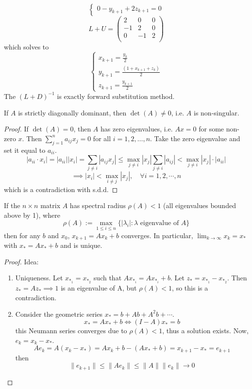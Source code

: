 \documentclass[11pt]{article}
\begin{document}
\begin{example}
\[\begin{cases}
            0-y_{k+1}+2z_{k+1} = 0 
        \end{cases}
    \]
    \[
    L+U =
        \begin{pmatrix}
            2 & 0 & 0\\
            -1 & 2 & 0 \\
            0 & -1 & 2 \\
        \end{pmatrix}
    \]
    which solves to
    \[
        \begin{cases}
            x_{k+1} = \frac{y_k}{2}\\
            y_{k+1} = \frac{(1+x_{k+1}+z_k)}{2}\\
            z_{k+1} = \frac{y_{k+1}}{2}
        \end{cases}
    \]
    The $(L+D)^{-1}$ is exactly forward substitution method.
\end{example}
\newpage
\begin{lemma}
    If $A$ is strictly diagonally dominant, then $\det(A) \ne 0$, i.e. $A$ is non-singular.   
\end{lemma}

\begin{proof}
    If $\det(A)=0$, then $A$ has zero eigenvalues, i.e. $Ax=0$ for some non-zero $x$.
    Then $\sum_{j=1}^{n}a_{ij}x_j = 0$ for all $i = 1,2,\dots,n$. Take the zero eigenvalue and set it equal to $a_{ii}$.
    \[
        |a_{ii} \cdot x_i| = |a_{ii}||x_i|=\sum_{j\ne i }|a_{ij}x_j| \le \max_{j\ne i}|x_j|\sum_{j\ne i }|a_{ij}| <\max_{j\ne i}|x_j|\cdot|a_{ii}|  
    \]
    \[
        \implies |x_i| < \max_{i \ne j}|x_j|, \quad \forall i = 1,2,\cdots, n
    \]
    which is a contradiction with s.d.d.
\end{proof}

\begin{lemma}
    If the $n \times n$ matrix $A$ has spectral radius $\rho (A) < 1$ (all eigenvalues bounded above by 1), where
    \[
        \rho (A) := \max_{1 \le i \le n}\{|\lambda_i| : \lambda \text{ eigenvalue of } A\}
    \]
    then for any $b$ and $x_0$, $x_{k+1} = Ax_k+b$ converges. In particular, $\lim_{k \to \infty} x_k = x_*$ with $x_* = Ax_* + b$ and is unique.
\end{lemma}
\begin{proof}
    Idea:
    \begin{enumerate}
        \item Uniqueness. Let $x_{*_1} = x_{*_2}$ such that $Ax_{*_i} = Ax_{*_i}+b$. Let $z_* = x_{*_1} - x_{*_2}$. 
        Then $z_* = Az_* \implies 1$ is an eigenvalue of A, but $\rho(A) < 1$, so this is a contradiction.
        \item Consider the geometric series $x_* = b+Ab + A^2b+\cdots$.
        \[
            x_* = Ax_* + b \iff (I-A)x_*=b
        \]
        this Neumann series converges due to $\rho(A)<1$, thus a solution exists. Now, $e_k = x_k-x_*$.
        \[
            Ae_k = A(x_k-x_*)=Ax_k+b-(Ax_*+b) = x_{k+1}-x_*=e_{k+1}
        \]
        then
        \[
            \| e_{k+1}\| \le \|Ae_k\| \le \|A\|\|e_k\| \rightarrow 0
        \]
    \end{enumerate}
    
\end{proof}
\end{document}
